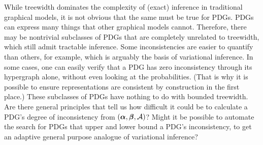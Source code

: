While treewidth dominates the complexity of (exact) inference in traditional graphical models, it is not obvious that the same must be true for PDGs. 
PDGs can express many things that other graphical models cannot. 
Therefore, there may be nontrivial subclasses of PDGs that are completely unrelated to treewidth, which still admit tractable inference. 
%
Some inconsistencies are easier to quantify than others, for example,
    which is arguably the basis of variational inference.
In some cases, one can easily verify that a PDG has zero inconsistency through its hypergraph alone, without even looking at the probabilities.
(That is why it is possible to ensure representations are consistent by construction in the first place.)
These subclasses of PDGs have nothing to do with bounded treewidth. 
Are there general principles that tell us how difficult it could be to calculate a PDG's degree of inconsistency from $(\boldsymbol\alpha,\boldsymbol\beta,\mathcal A)$?
Might it be possible to automate the 
    search for PDGs that upper and lower bound a PDG's inconsistency,
    to get an adaptive general purpose analogue of variational inference?
    
